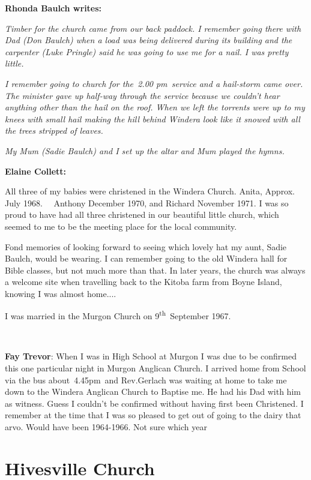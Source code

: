 \textbf{Rhonda Baulch writes:}

\emph{Timber for the church came from our back paddock. I remember going there with Dad (Don Baulch) when a load was being delivered during its building and the carpenter (Luke Pringle) said he was going to use me for a nail. I was pretty little.}

\emph{I remember going to church for the~2.00 pm~service and a hail-storm came over. The minister gave up half-way through the service because we couldn't hear anything other than the hail on the roof. When we left the torrents were up to my knees with small hail making the hill behind Windera look like it snowed with all the trees stripped of leaves.}

\emph{My Mum (Sadie Baulch) and I set up the altar and Mum played the hymns.}

\textbf{Elaine Collett:}

All three of my babies were christened in the Windera Church. Anita, Approx. July 1968.~~ Anthony December 1970, and Richard November 1971. I was so proud to have had all three christened in our beautiful little church, which seemed to me to be the meeting place for the local community.

Fond memories of looking forward to seeing which lovely hat my aunt, Sadie Baulch, would be wearing. I can remember going to the old Windera hall for Bible classes, but not much more than that. In later years, the church was always a welcome site when travelling back to the Kitoba farm from Boyne Island, knowing I was almost home.... ~

I was married in the Murgon Church on 9\textsuperscript{th}~September 1967.

~

\textbf{Fay Trevor}: When I was in High School at Murgon I was due to be confirmed this one particular night in Murgon Anglican Church. I arrived home from School via the bus about~4.45pm~and Rev.Gerlach was waiting at home to take me down to the Windera Anglican Church to Baptise me. He had his Dad with him as witness. Guess I couldn't be confirmed without having first been Christened. I remember at the time that I was so pleased to get out of going to the dairy that arvo. Would have been 1964-1966. Not sure which year

\hypertarget{hivesville-church}{%
\section{Hivesville Church}\label{hivesville-church}}

